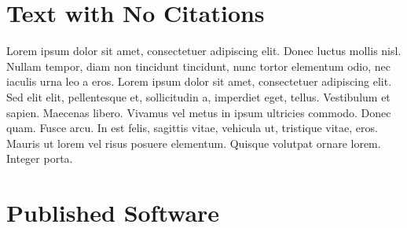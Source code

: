 \documentclass{article}
\begin{document}
\section*{Text with No Citations} 
Lorem ipsum dolor sit amet, consectetuer adipiscing elit. Donec luctus mollis
nisl. Nullam tempor, diam non tincidunt tincidunt, nunc tortor elementum odio,
nec iaculis urna leo a eros. Lorem ipsum dolor sit amet, consectetuer adipiscing
elit. Sed elit elit, pellentesque et, sollicitudin a, imperdiet eget, tellus.
Vestibulum et sapien. Maecenas libero. Vivamus vel metus in ipsum ultricies
commodo. Donec quam. Fusce arcu. In est felis, sagittis vitae, vehicula ut,
tristique vitae, eros. Mauris ut lorem vel risus posuere elementum. Quisque
volutpat ornare lorem. Integer porta.


\section*{Published Software}
\nocite{*}

 

\end{document}
